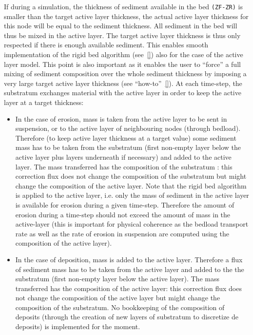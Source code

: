 If during a simulation, the thickness of sediment available in the bed \texttt{(ZF-ZR)} is smaller than the target active layer thickness, the actual active layer thickness for this node will be equal to the sediment thickness. All sediment in the bed will thus be mixed in the active layer. The target active layer thickness is thus only respected if there is enough available sediment. This enables smooth implementation of the rigid bed algorithm (see~\ref{}) also for the case of the active layer model. This point is also important as it enables the user to ``force'' a full mixing of sediment composition over the whole sediment thickness by imposing a very large target active layer thickness (see ``how-to''~\ref{}). At each time-step, the substratum exchanges material with the active layer in order to keep the active layer at a target thickness:

\begin{itemize}
\item In the case of erosion, mass is taken from the active layer to be sent in suspension, or to the active layer of neighbouring nodes (through bedload). Therefore (to keep active layer thickness at a target value) some sediment mass has to be taken from the substratum (first non-empty layer below the active layer plus layers underneath if necessary) and added to the active layer. The mass transferred has the composition of the substratum : this correction flux does not change the composition of the substratum but might change the composition of the active layer. Note that the rigid bed algorithm is applied to the active layer, i.e. only the mass of sediment in the active layer is available for erosion during a given time-step. Therefore the amount of erosion during a time-step should not exceed the amount of mass in the active-layer (this is important for physical coherence as the bedload transport rate as well as the rate of erosion in suspension are computed using the composition of the active layer).
  
\item In the case of deposition, mass is added to the active layer. Therefore a flux of sediment mass has to be taken from the active layer and added to the the substratum (first non-empty layer below the active layer). The mass transferred has the composition of the active layer: this correction flux does not change the composition of the active layer but might change the composition of the substratum. No bookkeeping of the composition of deposits (through the creation of new layers of substratum to discretize de deposits) is implemented for the moment.
\end{itemize}

